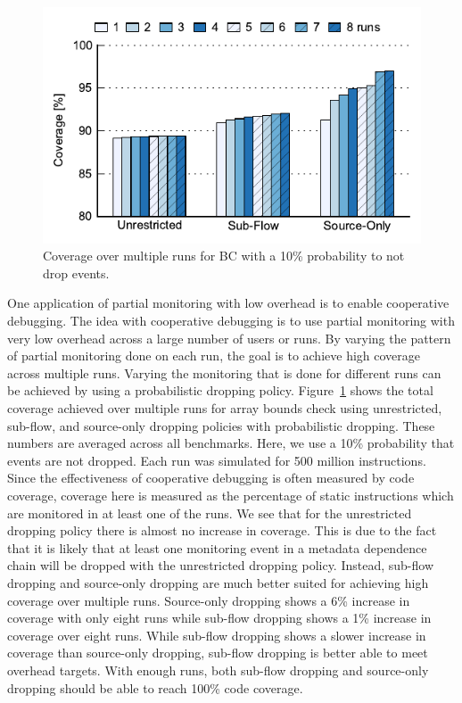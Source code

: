 \begin{figure}
  \begin{center}
    \includegraphics{monitoring_dift_drop/data/multi_run.pdf}
    \caption{Coverage over multiple runs for BC with a 10\% probability to not drop events.}
    \label{fig:monitoring_dift_drop.evaluation.multirun}
  \end{center}
\end{figure}

One application of partial monitoring with low overhead is to enable
cooperative debugging.  The idea with cooperative debugging is to use partial
monitoring with very low overhead across a large number of users or runs. By
varying the pattern of partial monitoring done on each run, the goal is to
achieve high coverage across multiple runs. Varying the monitoring that is done
for different runs can be achieved by using a probabilistic dropping policy.
Figure~\ref{fig:monitoring_dift_drop.evaluation.multirun} shows the total
coverage achieved over multiple runs for array bounds check using unrestricted,
sub-flow, and source-only dropping policies with probabilistic dropping.  These
numbers are averaged across all benchmarks. Here, we use a 10\% probability
that events are not dropped.  Each run was simulated for 500 million
instructions.  Since the effectiveness of cooperative debugging is often
measured by code coverage, coverage here is measured as the percentage of
static instructions which are monitored in at least one of the runs.  We see
that for the unrestricted dropping policy there is almost no increase in
coverage.  This is due to the fact that it is likely that at least one
monitoring event in a metadata dependence chain will be dropped with the
unrestricted dropping policy.  Instead, sub-flow dropping and source-only
dropping are much better suited for achieving high coverage over multiple runs.
Source-only dropping shows a 6\% increase in coverage with only eight runs
while sub-flow dropping shows a 1\% increase in coverage over eight runs.
While sub-flow dropping shows a slower increase in coverage than source-only
dropping, sub-flow dropping is better able to meet overhead targets.  With
enough runs, both sub-flow dropping and source-only dropping should be able to
reach 100\% code coverage.

